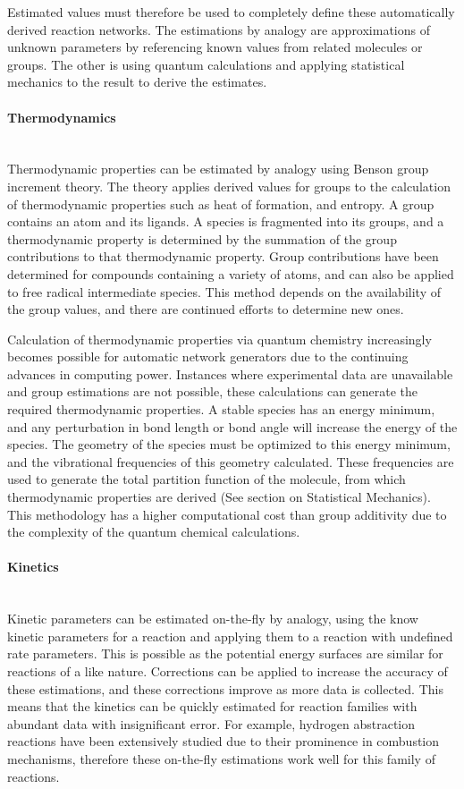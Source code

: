 \documentclass[12pt]{article}
\begin{document}
Estimated values must therefore be used to completely define these automatically derived reaction networks. The estimations by analogy are approximations of unknown parameters by referencing known values from related molecules or groups. The other is using quantum calculations and applying statistical mechanics to the result to derive the estimates.

\paragraph{Thermodynamics}\mbox{}\\
Thermodynamic properties can be estimated by analogy using Benson group increment theory. The theory applies derived values for groups to the calculation of thermodynamic properties such as heat of formation, and entropy. A group contains an atom and its ligands. A species is fragmented into its groups, and a thermodynamic property is determined by the summation of the group contributions to that thermodynamic property. Group contributions have been determined for compounds containing a variety of atoms, and can also be applied to free radical intermediate species. This method depends on the availability of the group values, and there are continued efforts to determine new ones.

Calculation of thermodynamic properties via quantum chemistry increasingly becomes possible for automatic network generators due to the continuing advances in computing power. Instances where experimental data are unavailable and group estimations are not possible, these calculations can generate the required thermodynamic properties. A stable species has an energy minimum, and any perturbation in bond length or bond angle will increase the energy of the species. The geometry of the species must be optimized to this energy minimum, and the vibrational frequencies of this geometry calculated. These frequencies are used to generate the total partition function of the molecule, from which thermodynamic properties are derived (See section on Statistical Mechanics). This methodology has a higher computational cost than group additivity due to the complexity of the quantum chemical calculations.

\paragraph{Kinetics}\mbox{}\\
Kinetic parameters can be estimated on-the-fly by analogy, using the know kinetic parameters for a reaction and applying them to a reaction with undefined rate parameters. This is possible as the potential energy surfaces are similar for reactions of a like nature. Corrections can be applied to increase the accuracy of these estimations, and these corrections improve as more data is collected. This means that the kinetics can be quickly estimated for reaction families with abundant data with insignificant error. For example, hydrogen abstraction reactions have been extensively studied due to their prominence in combustion mechanisms, therefore these on-the-fly estimations work well for this family of reactions.
\end{document}
